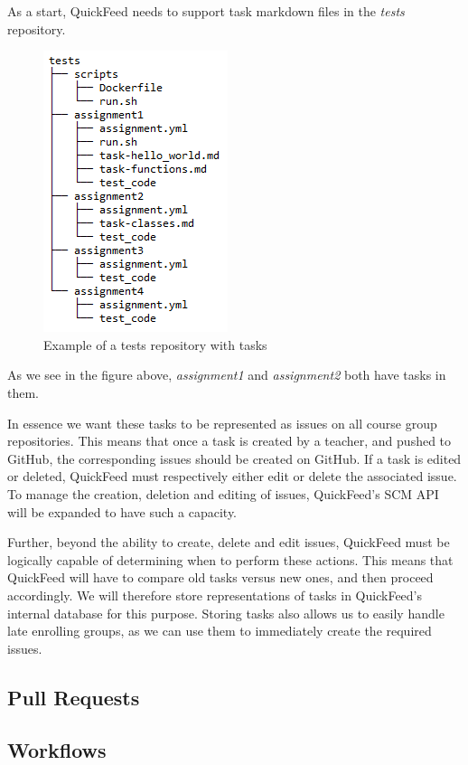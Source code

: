 As a start, QuickFeed needs to support task markdown files in the \textit{tests} repository.

\begin{figure}[ht]
    \centering
    \includegraphics[scale=0.8]{photos/tests-repository-structure-tasks.PNG}
    \caption{Example of a tests repository with tasks}
    \label{fig:tests-repository-structure-tasks}
\end{figure}

As we see in the figure above, \textit{assignment1} and \textit{assignment2} both have tasks in them.

In essence we want these tasks to be represented as issues on all course group repositories.
This means that once a task is created by a teacher, and pushed to GitHub, the corresponding issues should be created on GitHub.
If a task is edited or deleted, QuickFeed must respectively either edit or delete the associated issue.
To manage the creation, deletion and editing of issues, QuickFeed's SCM API will be expanded to have such a capacity.

Further, beyond the ability to create, delete and edit issues, QuickFeed must be logically capable of determining when to perform these actions.
This means that QuickFeed will have to compare old tasks versus new ones, and then proceed accordingly.
We will therefore store representations of tasks in QuickFeed's internal database for this purpose.
Storing tasks also allows us to easily handle late enrolling groups, as we can use them to immediately create the required issues.



\subsection{Pull Requests}


\subsection{Workflows}
